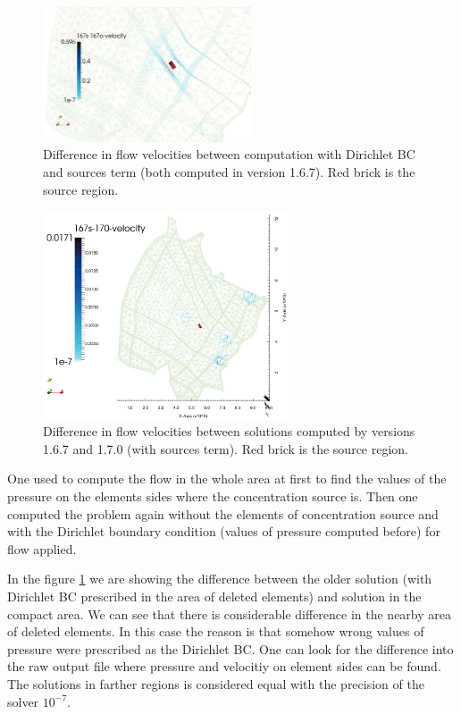 \begin{figure}[!h]
        \centering
        \includegraphics[width=0.55\textwidth]{tests_graphics/mel_167s-167_velocity.pdf}
        \caption{Difference in flow velocities between computation with Dirichlet BC and sources term (both computed in version 1.6.7). 
                 Red brick is the source region.}
        \label{fig:bench_mel1}
\end{figure}
%
\begin{figure}[!h]
        \centering
        \includegraphics[width=0.65\textwidth]{tests_graphics/mel_167s-170_velocity.pdf}
        \caption{Difference in flow velocities between solutions computed by versions 1.6.7 and 1.7.0 (with sources term).
                 Red brick is the source region.}
        \label{fig:bench_mel2}
\end{figure}

One used to compute the flow in the whole area at first to find the values of the pressure on the elements sides 
where the concentration source is. Then one computed the problem again without the elements of concentration source and with the 
Dirichlet boundary condition (values of pressure computed before) for flow applied. 

In the figure \ref{fig:bench_mel1} we are showing the difference between the older solution (with Dirichlet BC 
prescribed in the area of deleted elements) and solution in the compact area. We can see that there is 
considerable difference in the nearby area of deleted elements. In this case the reason is that somehow wrong values 
of pressure were prescribed as the Dirichlet BC. One can look for the difference into the raw output file 
where pressure and velocitiy on element sides can be found. The solutions in farther regions is considered equal 
with the precision of the solver $10^{-7}$.


